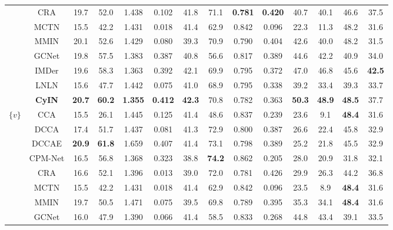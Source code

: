 \documentclass{article}
\begin{document}
\begin{table}[htbp]
{\begin{tabular}{cccccccccccccc}
        ~ & CRA & 19.7  & 52.0  & 1.438  & 0.102  & 41.8  & 71.1  & \textbf{0.781}  & \textbf{0.420}  & 40.7  & 40.1  & 46.6  & 37.5  \\ 
        ~ & MCTN & 15.5  & 42.2  & 1.431  & 0.018  & 41.4  & 62.9  & 0.842  & 0.096  & 22.3  & 11.3  & 48.2  & 31.6  \\ 
        ~ & MMIN & 20.1  & 52.6  & 1.429  & 0.080  & 39.3  & 70.9  & 0.790  & 0.404  & 42.6  & 40.0  & 48.2  & 31.5 \\ 
        ~ & GCNet & 19.8  & 57.5  & 1.383  & 0.387  & 40.8  & 56.6  & 0.817  & 0.389  & 44.6  & 42.2  & 40.9  & 34.0  \\ 
        ~ & IMDer & 19.6  & 58.3  & 1.363  & 0.392  & 42.1  & 69.9  & 0.795  & 0.372  & 47.0  & 46.8  & 45.6  & \textbf{42.5} \\ 
        ~ & LNLN & 15.6  & 47.7  & 1.442  & 0.075  & 41.0  & 68.9  & 0.795  & 0.338  & 39.2  & 33.4  & 39.3  & 33.7  \\ 
    & \textbf{CyIN}  & \textbf{20.7} & \textbf{60.2} & \textbf{1.355} & \textbf{0.412} & \textbf{42.3} & 70.8 & 0.782 & 0.363 & \textbf{50.3} & \textbf{48.9} & \textbf{48.5} & 37.7 \\ 
    \midrule[0.5pt]
    \multirow{11}{*}{$\{v\}$} ~ & CCA & 15.5  & 26.1  & 1.445  & 0.125  & 41.4  & 48.6  & 0.837  & 0.239  & 23.6  & 9.1  & \textbf{48.4}  & 31.6  \\ 
        ~ & DCCA & 17.4  & 51.7  & 1.437  & 0.081  & 41.3  & 72.9  & 0.800  & 0.387  & 26.6  & 22.4  & 45.8  & 32.9  \\ 
        ~ & DCCAE & \textbf{20.9}  & \textbf{61.8}  & 1.659  & 0.407  & 41.4  & 73.1  & 0.798  & 0.389  & 25.2  & 21.8  & 45.5  & 32.9  \\ 
        ~ & CPM-Net & 16.5  & 56.8  & 1.368  & 0.323  & 38.8  & \textbf{74.2}  & 0.862  & 0.205  & 28.0  & 20.9  & 31.8  & 32.1  \\ 
        ~ & CRA & 16.6  & 52.1  & 1.396  & 0.013  & 39.0  & 72.0  & 0.781  & 0.426  & 29.9  & 26.3  & 44.2  & 36.8  \\ 
        ~ & MCTN & 15.5  & 42.2  & 1.431  & 0.018  & 41.4  & 62.9  & 0.842  & 0.096  & 23.5  & 8.9  & \textbf{48.4}  & 31.6  \\ 
        ~ & MMIN & 19.7  & 50.5  & 1.471  & 0.075  & 39.5  & 69.8  & 0.789  & 0.395  & 35.3  & 34.1  & \textbf{48.4}  & 31.6 \\ 
        ~ & GCNet & 16.0  & 47.9  & 1.390  & 0.066  & 41.4  & 58.5  & 0.833  & 0.268  & 44.8  & 43.4  & 39.1  & 33.5  \\ 

\end{tabular}}
\end{table}
\end{document}
